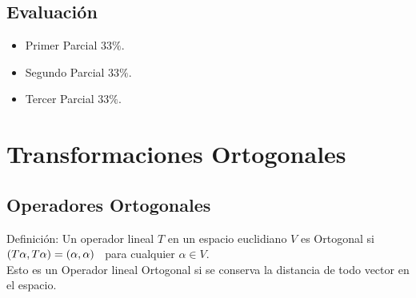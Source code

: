 \documentclass{book}
\begin{document}
\section{Evaluación}
\begin{itemize}
    \item Primer Parcial $33\%$.
    \item Segundo Parcial $33\%$.
    \item Tercer Parcial $33\%$.
        
\end{itemize}


\chapter{Transformaciones Ortogonales}
\section{Operadores Ortogonales}
Definición:
Un operador lineal $T$ en un espacio euclidiano $V$ es Ortogonal si $(T\alpha,T\alpha)=(\alpha,\alpha)\hspace{0.2cm}$ para cualquier $\alpha \in V$.
\\Esto es un Operador lineal Ortogonal si se conserva la distancia de todo vector en el espacio.
\end{document}
